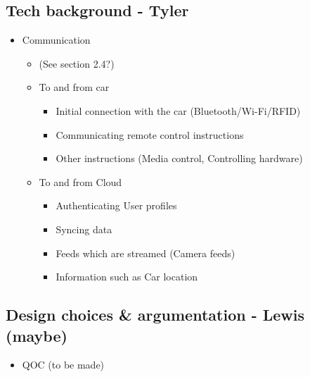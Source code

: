 \documentclass{article}
\begin{document}
\subsection{Tech background - Tyler}\label{ssec:app-tech}
\begin{itemize}
  \item Communication
    \begin{itemize}
      \item (See section 2.4?)
      \item To and from car
        \begin{itemize}
          \item Initial connection with the car (Bluetooth/Wi-Fi/RFID)
          \item Communicating remote control instructions
          \item Other instructions (Media control, Controlling hardware)
        \end{itemize}
      \item To and from Cloud
        \begin{itemize}
          \item Authenticating User profiles
          \item Syncing data
          \item Feeds which are streamed (Camera feeds)
          \item Information such as Car location
        \end{itemize}
    \end{itemize}
\end{itemize}

\subsection{Design choices \& argumentation - Lewis (maybe)}\label{ssec:app-design}
\begin{itemize}
  \item QOC (to be made)
\end{itemize}
\end{document}
